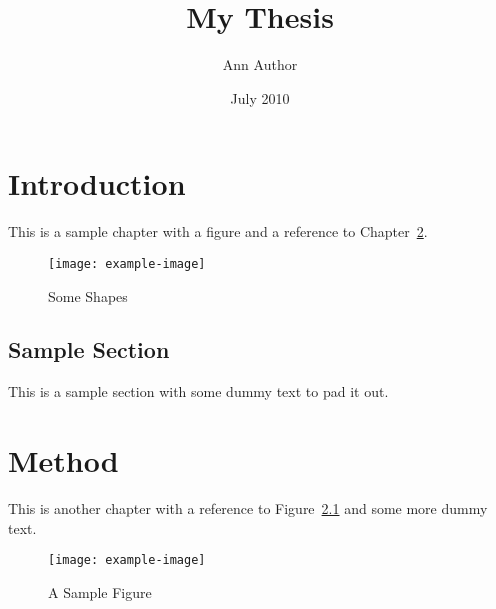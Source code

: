 \documentclass[oneside,numbers=noenddot]{scrbook}
\title{My Thesis}
\author{Ann Author}
\date{July 2010}
\begin{document}
\maketitle

\chapter{Introduction}

This is a sample chapter with a figure and a reference to Chapter~\ref{ch:method}.

\begin{figure}[htbp]
\centering
\texttt{[image: example-image]}
\caption{Some Shapes}
\end{figure}

\section{Sample Section}

This is a sample section with some dummy text to pad it out. \lipsum

\chapter{Method}\label{ch:method}

This is another chapter with a reference to Figure~\ref{fig:example-image}
and some more dummy text.

\begin{figure}[htbp]
\centering
\texttt{[image: example-image]}
\caption{A Sample Figure}\label{fig:example-image}
\end{figure}
\end{document}
